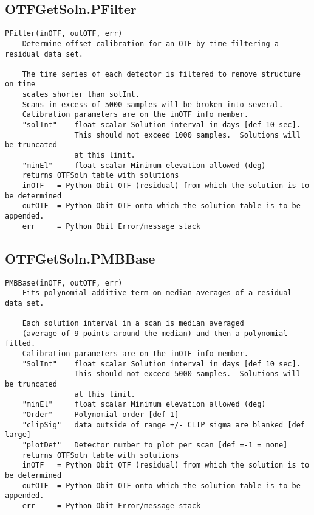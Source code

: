 \documentclass[11pt]{report}
\begin{document}
\subsection{OTFGetSoln.PFilter}
\begin{verbatim}
PFilter(inOTF, outOTF, err)
    Determine offset calibration for an OTF by time filtering a residual data set.
    
    The time series of each detector is filtered to remove structure on time 
    scales shorter than solInt. 
    Scans in excess of 5000 samples will be broken into several.
    Calibration parameters are on the inOTF info member.
    "solInt"    float scalar Solution interval in days [def 10 sec].
                This should not exceed 1000 samples.  Solutions will be truncated
                at this limit.
    "minEl"     float scalar Minimum elevation allowed (deg)
    returns OTFSoln table with solutions
    inOTF   = Python Obit OTF (residual) from which the solution is to be determined
    outOTF  = Python Obit OTF onto which the solution table is to be appended.
    err     = Python Obit Error/message stack
\end{verbatim}

\subsection{OTFGetSoln.PMBBase}
\begin{verbatim}
PMBBase(inOTF, outOTF, err)
    Fits polynomial additive term on median averages of a residual data set.
    
    Each solution interval in a scan is median averaged
    (average of 9 points around the median) and then a polynomial fitted.
    Calibration parameters are on the inOTF info member.
    "SolInt"    float scalar Solution interval in days [def 10 sec].
                This should not exceed 5000 samples.  Solutions will be truncated
                at this limit.
    "minEl"     float scalar Minimum elevation allowed (deg)
    "Order"     Polynomial order [def 1]
    "clipSig"   data outside of range +/- CLIP sigma are blanked [def large]
    "plotDet"   Detector number to plot per scan [def =-1 = none]
    returns OTFSoln table with solutions
    inOTF   = Python Obit OTF (residual) from which the solution is to be determined
    outOTF  = Python Obit OTF onto which the solution table is to be appended.
    err     = Python Obit Error/message stack
\end{verbatim}
\end{document}
